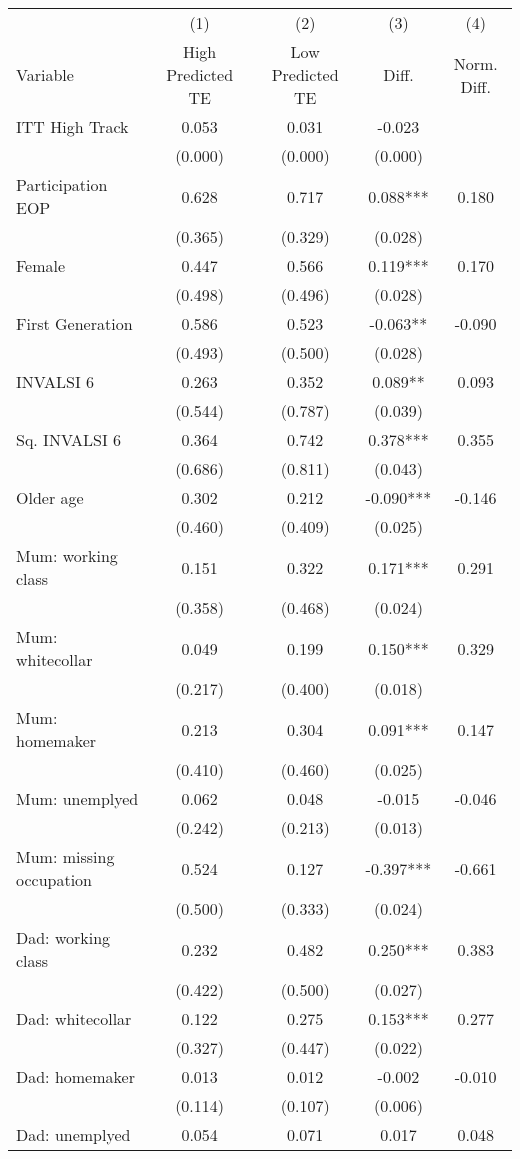 \begin{tabular}{l*{4}c}
\toprule
 & (1) & (2) & (3) & (4) \\
Variable & High Predicted TE & Low Predicted TE & Diff. & Norm. Diff. \\
\midrule
ITT High Track&0.053&0.031&-0.023&\\
&(0.000)&(0.000)&(0.000)&\\
Participation EOP&0.628&0.717&0.088***&0.180\\
&(0.365)&(0.329)&(0.028)&\\
Female&0.447&0.566&0.119***&0.170\\
&(0.498)&(0.496)&(0.028)&\\
First Generation&0.586&0.523&-0.063**&-0.090\\
&(0.493)&(0.500)&(0.028)&\\
INVALSI 6&0.263&0.352&0.089**&0.093\\
&(0.544)&(0.787)&(0.039)&\\
Sq. INVALSI 6&0.364&0.742&0.378***&0.355\\
&(0.686)&(0.811)&(0.043)&\\
Older age&0.302&0.212&-0.090***&-0.146\\
&(0.460)&(0.409)&(0.025)&\\
Mum: working class&0.151&0.322&0.171***&0.291\\
&(0.358)&(0.468)&(0.024)&\\
Mum: whitecollar&0.049&0.199&0.150***&0.329\\
&(0.217)&(0.400)&(0.018)&\\
Mum: homemaker&0.213&0.304&0.091***&0.147\\
&(0.410)&(0.460)&(0.025)&\\
Mum: unemplyed&0.062&0.048&-0.015&-0.046\\
&(0.242)&(0.213)&(0.013)&\\
Mum: missing occupation&0.524&0.127&-0.397***&-0.661\\
&(0.500)&(0.333)&(0.024)&\\
Dad: working class&0.232&0.482&0.250***&0.383\\
&(0.422)&(0.500)&(0.027)&\\
Dad: whitecollar&0.122&0.275&0.153***&0.277\\
&(0.327)&(0.447)&(0.022)&\\
Dad: homemaker&0.013&0.012&-0.002&-0.010\\
&(0.114)&(0.107)&(0.006)&\\
Dad: unemplyed&0.054&0.071&0.017&0.048\\

\end{tabular}

